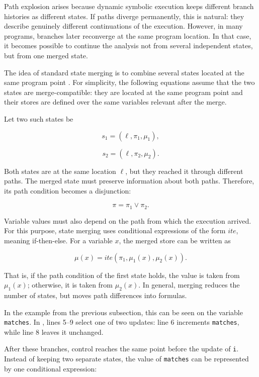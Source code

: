 \documentclass[conference]{IEEEtran}
\newcommand{\ite}{\mathit{ite}}
\begin{document}
Path explosion arises because dynamic symbolic execution keeps different
branch histories as different states. If paths diverge permanently, this is
natural: they describe genuinely different continuations of the execution.
However, in many programs, branches later reconverge at the same program
location. In that case, it becomes possible to continue the analysis not from
several independent states, but from one merged state.

The idea of standard state merging is to combine several states located at the
same program point \cite{efficient-merging,multise}. For simplicity, the
following equations assume that the two states are
merge-compatible: they are located at the same program point and their stores
are defined over the same variables relevant after the merge.

Let two such states be

\[
s_1 = (\ell, \pi_1, \mu_1),
\]

\[
s_2 = (\ell, \pi_2, \mu_2).
\]

Both states are at the same location \(\ell\), but they reached it through
different paths. The merged state must preserve information about both paths.
Therefore, its path condition becomes a disjunction:

\begin{equation}
\label{eq:merged-path-condition}
\pi = \pi_1 \lor \pi_2.
\end{equation}

Variable values must also depend on the path from which the execution arrived.
For this purpose, state merging uses conditional expressions of the form
\(\ite\), meaning if-then-else. For a variable \(x\), the merged store can be
written as

\begin{equation}
\label{eq:merged-store}
\mu(x) = \ite(\pi_1, \mu_1(x), \mu_2(x)).
\end{equation}

That is, if the path condition of the first state holds, the value is taken
from \(\mu_1(x)\); otherwise, it is taken from \(\mu_2(x)\). In general,
merging reduces the number of states, but moves path differences into formulas.

In the example from the previous subsection, this can be seen on the variable
\texttt{matches}. In , lines 5--9 select one of two
updates: line 6 increments \texttt{matches}, while line 8 leaves it unchanged.

After these branches, control reaches the same point before the update of
\texttt{i}. Instead of keeping two separate states, the value of
\texttt{matches} can be represented by one conditional expression:
\end{document}
